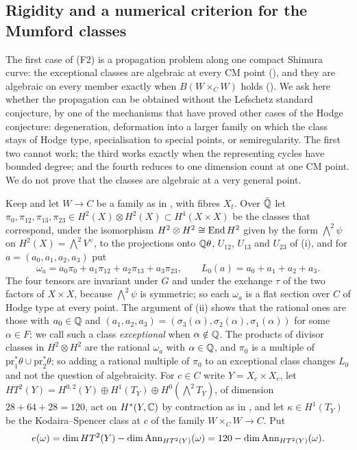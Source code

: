 \subsection{Rigidity and a numerical criterion for the Mumford
classes}\label{ssec:mumfordrigid}

The first case of (F2) is a propagation problem along one compact Shimura
curve: the exceptional classes are algebraic at every CM point
(), and they are algebraic on every member exactly when
$B(W\times_{C}W)$ holds (). We ask here whether the
propagation can be obtained without the Lefschetz standard conjecture, by one
of the mechanisms that have proved other cases of the Hodge conjecture:
degeneration, deformation into a larger family on which the class stays of
Hodge type, specialisation to special points, or semiregularity. The first
two cannot work; the third works exactly when the representing cycles have
bounded degree; and the fourth reduces to one dimension count at one CM
point. We do not prove that the classes are algebraic at a very general
point.

\begin{setupenv}\label{setup:omegaa}
Keep  and let $W\to C$ be a family as in
, with fibres $X_{t}$. Over $\bar{\mathbb{Q}}$ let
$\pi_{0},\pi_{12},\pi_{13},\pi_{23}\in H^{2}(X)\otimes H^{2}(X)\subset
H^{4}(X\times X)$ be the classes that correspond, under the isomorphism
$H^{2}\otimes H^{2}\cong\operatorname{End} H^{2}$ given by the form ${\textstyle\bigwedge^{2}}\psi$
on $H^{2}(X)={\textstyle\bigwedge^{2}}V^{\vee}$, to the projections onto $\mathbb{Q}\theta$,
$U_{12}$, $U_{13}$ and $U_{23}$ of (i), and for
$a=(a_{0},a_{1},a_{2},a_{3})$ put
\[
  \omega_{a}=a_{0}\pi_{0}+a_{1}\pi_{12}+a_{2}\pi_{13}+a_{3}\pi_{23},
  \qquad L_{0}(a)=a_{0}+a_{1}+a_{2}+a_{3}.
\]
The four tensors are invariant under $G$ and under the exchange $\tau$ of the
two factors of $X\times X$, because ${\textstyle\bigwedge^{2}}\psi$ is symmetric; so each
$\omega_{a}$ is a flat section over $C$ of Hodge type at every point. The
argument of (ii) shows that the rational ones are those
with $a_{0}\in\mathbb{Q}$ and $(a_{1},a_{2},a_{3})=(\sigma_{3}(\alpha),
\sigma_{2}(\alpha),\sigma_{1}(\alpha))$ for some $\alpha\in F$; we call such a
class \emph{exceptional} when $\alpha\notin\mathbb{Q}$. The products of divisor
classes in $H^{2}\otimes H^{2}$ are the rational $\omega_{a}$ with
$\alpha\in\mathbb{Q}$, and $\pi_{0}$ is a multiple of
$\mathrm{pr}_{1}^{*}\theta\cup\mathrm{pr}_{2}^{*}\theta$; so adding a rational
multiple of $\pi_{0}$ to an exceptional class changes $L_{0}$ and not the
question of algebraicity. For $c\in C$ write $Y=X_{c}\times X_{c}$, let
$HT^{2}(Y)=H^{0,2}(Y)\oplus H^{1}(T_{Y})\oplus H^{0}({\textstyle\bigwedge^{2}}T_{Y})$,
of dimension $28+64+28=120$, act on $H^{*}(Y,\mathbb{C})$ by contraction as in
, and let $\kappa\in H^{1}(T_{Y})$ be the Kodaira--Spencer class
at $c$ of the family $W\times_{C}W\to C$. Put
\[
  e(\omega)=\dim HT^{2}(Y)-\dim\operatorname{Ann}_{HT^{2}(Y)}(\omega)
  =120-\dim\operatorname{Ann}_{HT^{2}(Y)}(\omega).
\]
\end{setupenv}

